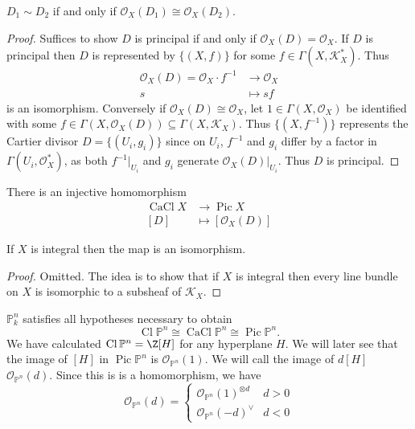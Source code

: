 \documentclass[a4paper]{article}
\renewcommand*{\P}{\mathbb{P}}
\newcommand{\sh}[1]{\mathcal{#1}} %
\DeclareMathOperator{\Pic}{Pic} %
\DeclareMathOperator{\Cl}{Cl} %
\DeclareMathOperator{\CaCl}{CaCl} %
\begin{document}
\begin{lemma}
  \(D_1 \sim D_2\) if and only if \(\sh O_X(D_1) \cong \sh O_X(D_2)\).
\end{lemma}

\begin{proof}
  Suffices to show \(D\) is principal if and only if \(\sh O_X(D) = \sh O_X\). If \(D\) is principal then \(D\) is represented by \(\{(X, f)\}\) for some \(f \in \Gamma(X, \sh K_X^*)\). Thus
  \begin{align*}
    \sh O_X(D) = \sh O_X \cdot f^{-1} &\to \sh O_X \\
    s &\mapsto sf
  \end{align*}
  is an isomorphism. Conversely if \(\sh O_X(D) \cong \sh O_X\), let \(1 \in \Gamma(X, \sh O_X)\) be identified with some \(f \in \Gamma(X, \sh O_X(D)) \subseteq \Gamma(X, \sh K_X)\). Thus \(\{(X, f^{-1})\}\) represents the Cartier divisor \(D = \{(U_i, g_i)\}\) since on \(U_i\), \(f^{-1}\) and \(g_i\) differ by a factor in \(\Gamma(U_i, \sh O_X^*)\), as both \(f^{-1}|_{U_i}\) and \(g_i\) generate \(\sh O_X(D)|_{U_i}\). Thus \(D\) is principal.
\end{proof}

\begin{corollary}
  There is an injective homomorphism
  \begin{align*}
    \CaCl X &\to \Pic X \\
    [D] &\mapsto [\sh O_X(D)]
  \end{align*}
\end{corollary}

\begin{proposition}
  If \(X\) is integral then the map is an isomorphism.
\end{proposition}

\begin{proof}
  Omitted. The idea is to show that if \(X\) is integral then every line bundle on \(X\) is isomorphic to a subsheaf of \(\sh K_X\).
\end{proof}

\begin{eg}
  \(\P_k^n\) satisfies all hypotheses necessary to obtain
  \[
    \Cl \P^n \cong \CaCl \P^n \cong \Pic \P^n.
  \]
  We have calculated \(\Cl \P^n = \Z[H]\) for any hyperplane \(H\). We will later see that the image of \([H]\) in \(\Pic \P^n\) is \(\sh O_{\P^n}(1)\). We will call the image of \(d [H]\) \(\sh O_{\P^n}(d)\). Since this is is a homomorphism, we have
  \[
    \sh O_{\P^n}(d) =
    \begin{cases}
      \sh O_{\P^n}(1)^{\otimes d} & d > 0 \\
      \sh O_{\P^n}(-d)^\vee & d < 0
    \end{cases}
  \]
\end{eg}
\end{document}
